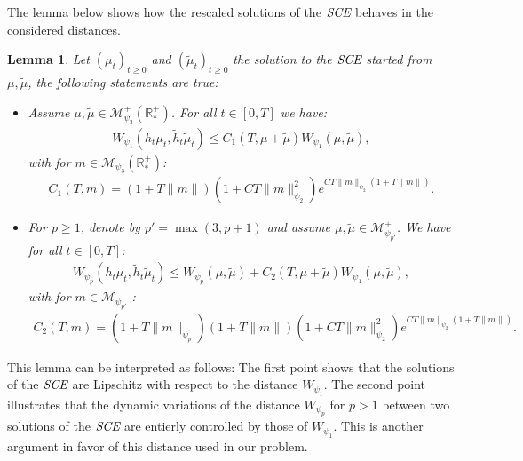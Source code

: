 \documentclass[11pt,a4paper]{article}
\newcommand{\RRP}{\mathbb{R}^+_*}
\newcommand{\MC}{\mathcal{M}}
\newcommand{\SCE}{\emph{SCE}}
\newcommand{\Proc}[1]{\left(#1\right)_{t\geq 0}}
\newtheorem{lemma}[theorem]{Lemma}
\begin{document}
The lemma below shows how the rescaled solutions of the $\SCE$ behaves in the considered distances.
\begin{lemma}\label{lem:wass-rescaled-SCE}
    Let $\Proc{\mu_t}$ and $\Proc{\tilde{\mu}_t}$ the solution to the $\SCE$ started from $\mu, \tilde{\mu}$, the following statements are true:
    \begin{itemize}
        \item Assume $\mu, \tilde{\mu} \in \MC^+_{\psi_3}(\RRP)$. For all $t \in [0,T]$ we have:
            \begin{align*}
                W_{\psi_1} \left(h_t\mu_t ,\tilde{h}_t\tilde{\mu}_t\right) \leq  C_1(T,\mu + \tilde{\mu})W_{\psi_1}(\mu,\tilde{\mu}),
            \end{align*}
            with for $m \in \MC_{\psi_3}(\RRP)$:
            \begin{align*}
                C_1(T,m) = \left( 1 + T\|m\|\right)\left(1 +  CT\|m\|_{\psi_2}^2\right) e^{CT\|m\|_{\psi_2}\left(1 + T\|m\|\right)}.
            \end{align*}
        \item For $p \geq 1$, denote by $p' = \max(3,p+1)$ and assume $\mu, \tilde{\mu} \in \MC^+_{\psi_{p'}}$. We have for all $t \in [0,T]$:
            \begin{align*}
                W_{\psi_p} \left(h_t\mu_t ,\tilde{h}_t\tilde{\mu}_t\right) \leq W_{\psi_p}(\mu,\tilde{\mu}) + C_2(T,\mu + \tilde{\mu})W_{\psi_1}(\mu,\tilde{\mu}),
            \end{align*}
            with for $m \in \MC_{\psi_{p'}}$ :
            \begin{align*}
                C_2(T,m) = ( 1  + T\|m\|_{\psi_{p}})\left( 1 + T\|m\|\right)\left(1 +  CT\|m\|_{\psi_2}^2\right) e^{CT\|m\|_{\psi_2}\left(1 + T\|m\|\right)}.
            \end{align*}
    \end{itemize}
\end{lemma}
This lemma can be interpreted as follows: The first point shows that the solutions of the $\SCE$ are Lipschitz with respect to the distance $W_{\psi_1}$. The second point illustrates that the dynamic variations of the distance $W_{\psi_p}$ for $p > 1$ between two solutions of the $\SCE$ are entierly controlled by those of $W_{\psi_1}$. This is another argument in favor of this distance used in our problem.
\end{document}
